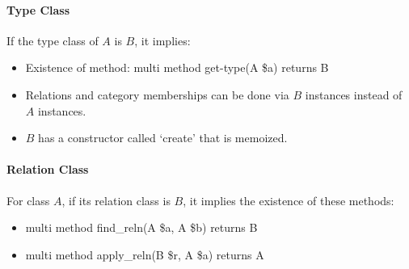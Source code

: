 \documentclass{article}
\begin{document}
\paragraph{Type Class} If the type class of $A$ is $B$, it implies:
\begin{itemize}
\item Existence of method: multi method get-type(A \$a) returns B
\item Relations and category memberships can be done via $B$ instances instead of $A$ instances.
\item $B$ has a constructor called `create' that is memoized.  
\end{itemize}

\paragraph{Relation Class}

For class $A$, if its relation class is $B$, it implies the existence of these methods:
\begin{itemize}
\item multi method find\_reln(A \$a, A \$b) returns B
\item multi method apply\_reln(B \$r, A \$a) returns A
\end{itemize}
\end{document}
